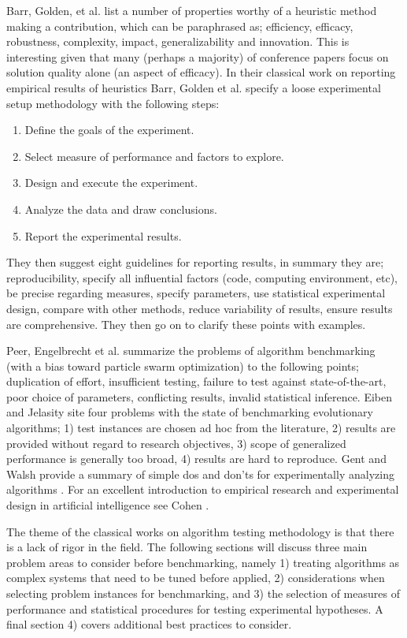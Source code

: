 Barr, Golden, et al. \cite{Barr1995} list a number of properties worthy of a heuristic method making a contribution, which can be paraphrased as; efficiency, efficacy, robustness, complexity, impact, generalizability and innovation. This is interesting given that many (perhaps a majority) of conference papers focus on solution quality alone (an aspect of efficacy).
In their classical work on reporting empirical results of heuristics Barr, Golden et al. specify a loose experimental setup methodology with the following steps:

\begin{enumerate}
	\item Define the goals of the experiment.
	\item Select measure of performance and factors to explore.
	\item Design and execute the experiment.
	\item Analyze the data and draw conclusions.
	\item Report the experimental results.
\end{enumerate}

They then suggest eight guidelines for reporting results, in summary they are; reproducibility, specify all influential factors (code, computing environment, etc), be precise regarding measures, specify parameters, use statistical experimental design, compare with other methods, reduce variability of results, ensure results are comprehensive. They then go on to clarify these points with examples.

Peer, Engelbrecht et al. \cite{Peer2003} summarize the problems of algorithm benchmarking (with a bias toward particle swarm optimization) to the following points; duplication of effort, insufficient testing, failure to test against state-of-the-art, poor choice of parameters, conflicting results, invalid statistical inference. Eiben and Jelasity \cite{Eiben2002} site four problems with the state of benchmarking evolutionary algorithms; 1) test instances are chosen ad hoc from the literature, 2) results are provided without regard to research objectives, 3) scope of generalized performance is generally too broad, 4) results are hard to reproduce.
Gent and Walsh provide a summary of simple dos and don'ts for experimentally analyzing algorithms \cite{Gent1994}. For an excellent introduction to empirical research and experimental design in artificial intelligence see Cohen \cite{Cohen1995}.

The theme of the classical works on algorithm testing methodology is that there is a lack of rigor in the field. The following sections will discuss three main problem areas to consider before benchmarking, namely 1) treating algorithms as complex systems that need to be tuned before applied, 2) considerations when selecting problem instances for benchmarking, and 3) the selection of measures of performance and statistical procedures for testing experimental hypotheses. A final section 4) covers additional best practices to consider.


